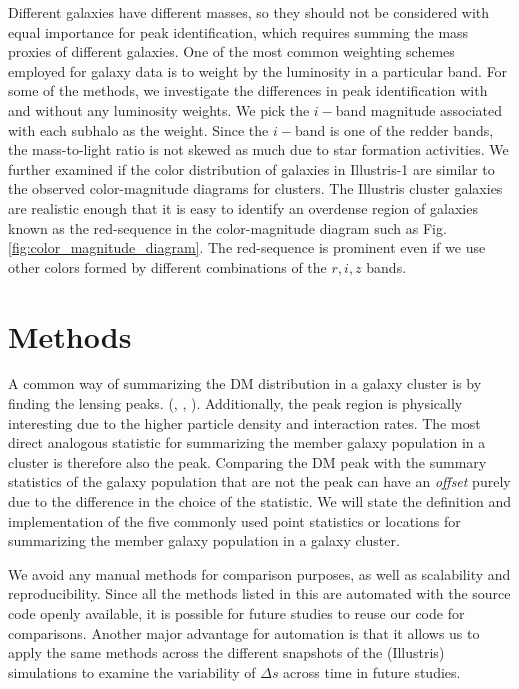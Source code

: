 Different galaxies have different masses, so they should not be considered with equal
importance for peak identification, which requires summing
the mass proxies of different galaxies. One of the most common weighting schemes employed for galaxy data is to weight
by the luminosity in a particular band. For some of the methods, we investigate
the differences in peak identification with and without any luminosity weights.
We pick the $i-$band magnitude
associated with each subhalo as the weight. Since the $i-$band is
one of the redder bands, the mass-to-light ratio is not skewed as much due to star
formation activities. 
We further examined if the color distribution of galaxies in Illustris-1 are
similar to the observed color-magnitude diagrams for clusters.
The Illustris cluster galaxies are realistic enough that it is easy to
identify an overdense region of galaxies known as the red-sequence in the 
color-magnitude diagram such as Fig.
\ref{fig:color_magnitude_diagram}. The red-sequence is prominent even if we
use other colors formed by different combinations of the $r, i, z$ bands.

\section{Methods}\label{sec:methods}
A common way of summarizing the DM distribution in a
galaxy cluster is by finding the lensing peaks.
(\citealt{Medezinski2013}, \citealt{Markevitch2004}, 
\citealt{Zitrin13}). 
Additionally, the peak region is physically 
interesting due to the higher particle density and interaction rates. 
The most direct analogous statistic for summarizing the member galaxy
population in a cluster is therefore also the peak. 
Comparing the DM peak with the summary statistics of the galaxy population that
are not the peak  can have an {\it offset} purely due to the difference in
the choice of the statistic. 
We will state the definition and implementation of the five commonly used 
point statistics or locations for summarizing 
the member galaxy population in a galaxy cluster.

We avoid any manual methods for
comparison purposes, as well as scalability and reproducibility. 
Since all the methods listed in this 
are automated with the source code openly available, 
it is possible for future studies to reuse our code for comparisons. 
Another major advantage for automation is that it allows us  
to apply
the same methods across the different snapshots of the (Illustris) simulations to
examine the variability of $\Delta s$ across time in future studies. 


